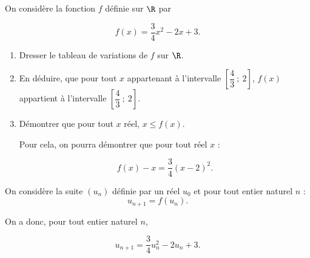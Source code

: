 \medskip

On considère la fonction $f$ définie sur $\R$ par 

\[f(x) = \dfrac34 x^2 - 2x + 3.\]

\begin{enumerate}
\item Dresser le tableau de variations de $f$ sur $\R$.
\item En déduire, que pour tout $x$ appartenant à l'intervalle $\left[\dfrac43~;~2\right]$,\: $f(x)$ appartient à l'intervalle $\left[\dfrac43~;~2\right]$.
\item Démontrer que pour tout $x$ réel, $x \leqslant f(x)$.

Pour cela, on pourra démontrer que pour tout réel $x$ :

\[f(x) - x = \dfrac34(x - 2)^2.\]

\end{enumerate}

On considère la suite $\left(u_n\right)$ définie par un réel $u_0$ et pour tout entier naturel $n$ :
\[u_{n+1} = f\left(u_n\right).\]

On a donc, pour tout entier naturel $n$,

\[u_{n+1} = \dfrac34 u_n^2 - 2u_n + 3.\]

